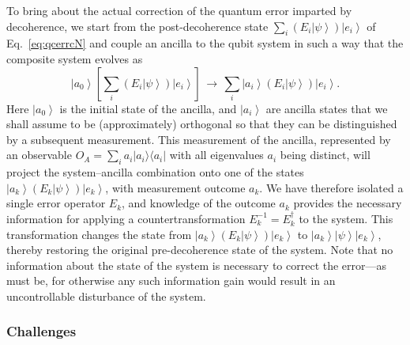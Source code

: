 \documentclass[3p,sort&compress,12pt]{elsarticle}
\newcommand{\ket}[1]{\left\vert{#1}\right\rangle}
\newcommand{\ketbra}[2]{\ensuremath{|{#1 \rangle}{\langle #2}|}}
\newcommand{\op}[1]{#1}
\begin{document}
To bring about the actual correction of the quantum error imparted by decoherence, we start from the post-decoherence state $\sum_{i}   \left( E_i \ket{\psi} \right) \ket{e_i}$ of Eq.~\eqref{eq:qcerrcN} and couple an ancilla to the qubit system in such a way that the composite system evolves as 
%
\begin{equation}\label{eq:errfsyn}
  \ket{a_0} \left[ \sum_{i} \left( E_i   \ket{\psi} \right)
    \ket{e_i} \right] \, \longrightarrow \, 
  \sum_{i} \ket{a_i} \left( E_i \ket{\psi} \right)
  \ket{e_i}.
\end{equation}
%
Here $\ket{a_0}$ is the initial state of the ancilla, and $\ket{a_i}$ are ancilla states that we shall assume to be (approximately) orthogonal so that they can be distinguished by a subsequent measurement. This measurement of the ancilla, represented by an observable  $\op{O}_A = \sum_i a_i \ketbra{a_i}{a_i}$ with all eigenvalues $a_i$ being distinct, will project the system--ancilla combination onto one of the states $\ket{a_k} \left( E_k \ket{\psi} \right) \ket{e_k}$, with measurement outcome $a_k$. We have therefore isolated a single error operator $E_k$, and knowledge of the outcome $a_k$ provides the necessary information for applying a countertransformation $E_k^{-1}=E_k^\dagger$ to the system. This transformation changes the state from $\ket{a_k} \left( E_k \ket{\psi} \right) \ket{e_k}$ to $\ket{a_k} \ket{\psi} \ket{e_k}$, thereby restoring the original pre-decoherence state of the system. Note that no information about the state of the system is necessary to correct the error---as must be, for otherwise any such information gain would result in an uncontrollable disturbance of the system.

\subsubsection{Challenges}
\end{document}
